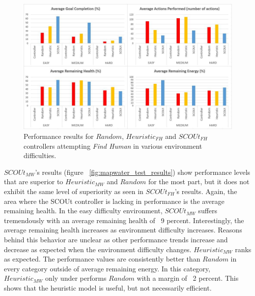 \begin{figure}[H]
  \includegraphics[width=1.0\columnwidth]{Figures/Results/Experiment1/FindHuman.JPG}
  \caption{Performance results for $Random$, $Heuristic_{FH}$ and $SCOUt_{FH}$ controllers attempting \textit{Find Human} in various environment difficulties.}
  \label{fig:findhuman_test_results}
\end{figure}


$SCOUt_{MW}$'s results (figure ~\ref{fig:mapwater_test_results}) show performance levels that are superior to $Heuristic_{MW}$ and $Random$ for the most part, but it does not exhibit the same level of superiority as seen in $SCOUt_{FH}$'s results.
Again, the area where the SCOUt controller is lacking in performance is the average remaining health.
In the easy difficulty environment, $SCOUt_{MW}$ suffers tremendously with an average remaining health of ~9 percent.
Interestingly, the average remaining health increases as environment difficulty increases.
Reasons behind this behavior are unclear as other performance trends increase and decrease as expected when the environment difficulty changes.
$Heuristic_{MW}$ ranks as expected.
The performance values are consistently better than $Random$ in every category outside of average remaining energy.
In this category, $Heuristic_{MW}$ only under performs $Random$ with a margin of ~2 percent.
This shows that the heuristic model is useful, but not necessarily efficient.


